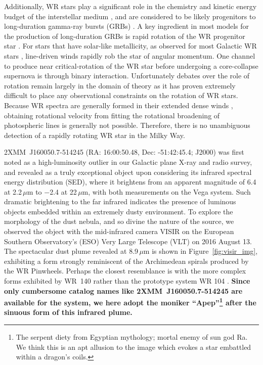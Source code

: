 \documentclass[preprint,times]{aastex61}
\begin{document}

Additionally, WR stars play a significant role in the chemistry and kinetic energy budget of the interstellar medium \citep{2007ARA&A..45..177C}, and are considered to be likely progenitors to long-duration gamma-ray bursts (GRBs) \citep{2006ApJ...637..914W,2008A&A...484..831D}. A key ingredient in most models for the production of long-duration GRBs is rapid rotation of the WR progenitor star \citep{2006ApJ...637..914W}. For stars that have solar-like metallicity, as observed for most Galactic WR stars \citep{2005A&A...429..581M,2016A&A...588A..50M}, line-driven winds rapidly rob the star of angular momentum. One channel to produce near critical-rotation of the WR star before undergoing a core-collapse supernova is through binary interaction\citep{2005ApJ...623..302F}. Unfortunately debates over the role of rotation remain largely in the domain of theory as it has proven extremely difficult to place any observational constraints on the rotation of WR stars. Because WR spectra are generally formed in their extended dense winds \citep{2014A&A...562A.118S}, obtaining rotational velocity from fitting the rotational broadening of photospheric lines is generally not possible. Therefore, there is no unambiguous detection of a rapidly rotating WR star in the Milky Way.

2XMM~J160050.7-514245 (RA: 16:00:50.48, Dec: -51:42:45.4; J2000) was first noted as a high-luminosity outlier in our Galactic plane X-ray and radio survey, and revealed as a truly exceptional object upon considering its infrared spectral energy distribution (SED), where it brightens from an apparent magnitude of 6.4 at 2.2\,$\mu$m \citep{Skrutskie2006} to $-$2.4 at 22\,$\mu$m\citep{Wright2010}, with both measurements on the Vega system. Such dramatic brightening to the far infrared indicates the presence of luminous objects embedded within an extremely dusty environment. To explore the morphology of the dust nebula, and so divine the nature of the source, we observed the object with the mid-infrared camera VISIR on the European Southern Observatory's (ESO) Very Large Telescope (VLT) on 2016 August 13. The spectacular dust plume revealed at 8.9\,$\mu$m is shown in Figure~\ref{fig:visir_img}, exhibiting a form strongly reminiscent of the Archimedean spirals produced by the WR Pinwheels. Perhaps the closest resemblance is with the more complex forms exhibited by WR~140 \citep{Monnier2002,Williams2009} rather than the prototype system WR 104 \citep{1999Natur.398..487T}. \textbf{Since only cumbersome catalog names like 2XMM~J160050.7-514245 are available for the system, we here adopt the moniker ``Apep''\footnote{The serpent diety from Egyptian mythology; mortal enemy of sun god Ra. We think this is an apt allusion to the image which evokes a star embattled within a dragon's coils.} after the sinuous form of this infrared plume.} 
\end{document}
